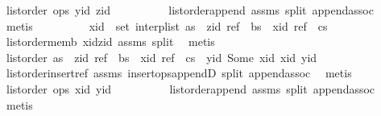 \begin{isabellebody}
\ {\isachardoublequoteopen}list{\isacharunderscore}order\ ops\ yid\ zid{\isachardoublequoteclose}\isanewline
\ \ \ \ \ \ \ \ \isamarkupfalse%
\ list{\isacharunderscore}order{\isacharunderscore}append\ assms{\isacharparenleft}{}{\isacharparenright}\ split\ append{\isachardot}assoc\ \isamarkupfalse%
\ metis\isanewline
\ \ \ \ \ \ \isamarkupfalse%
\ \isamarkupfalse%
\ {\isachardoublequoteopen}xid\ {\isasymin}\ set\ {\isacharparenleft}interp{\isacharunderscore}list\ {\isacharparenleft}as\ {\isacharat}\ {\isacharbrackleft}{\isacharparenleft}zid{\isacharcomma}\ ref{\isacharparenright}{\isacharbrackright}\ {\isacharat}\ bs\ {\isacharat}\ {\isacharbrackleft}{\isacharparenleft}xid{\isacharcomma}\ ref{\isacharparenright}{\isacharbrackright}\ {\isacharat}\ cs{\isacharparenright}{\isacharparenright}{\isachardoublequoteclose}\isanewline
\ \ \ \ \ \ \ \ \isamarkupfalse%
\ list{\isacharunderscore}order{\isacharunderscore}memb{}\ xid{\isacharunderscore}zid\ assms{\isacharparenleft}{}{\isacharparenright}\ split\ \isamarkupfalse%
\ metis\isanewline
\ \ \ \ \ \ \isamarkupfalse%
\ {\isachardoublequoteopen}list{\isacharunderscore}order\ {\isacharparenleft}as\ {\isacharat}\ {\isacharbrackleft}{\isacharparenleft}zid{\isacharcomma}\ ref{\isacharparenright}{\isacharbrackright}\ {\isacharat}\ bs\ {\isacharat}\ {\isacharbrackleft}{\isacharparenleft}xid{\isacharcomma}\ ref{\isacharparenright}{\isacharbrackright}\ {\isacharat}\ cs\ {\isacharat}\ {\isacharbrackleft}{\isacharparenleft}yid{\isacharcomma}\ Some\ xid{\isacharparenright}{\isacharbrackright}{\isacharparenright}\ xid\ yid{\isachardoublequoteclose}\isanewline
\ \ \ \ \ \ \ \ \isamarkupfalse%
\ list{\isacharunderscore}order{\isacharunderscore}insert{\isacharunderscore}ref\ assms{\isacharparenleft}{}{\isacharparenright}\ insert{\isacharunderscore}ops{\isacharunderscore}appendD\ split\ append{\isachardot}assoc\ \isamarkupfalse%
\ metis\isanewline
\ \ \ \ \ \ \isamarkupfalse%
\ {\isachardoublequoteopen}list{\isacharunderscore}order\ ops\ xid\ yid{\isachardoublequoteclose}\isanewline
\ \ \ \ \ \ \ \ \isamarkupfalse%
\ list{\isacharunderscore}order{\isacharunderscore}append\ assms{\isacharparenleft}{}{\isacharparenright}\ split\ append{\isachardot}assoc\ \isamarkupfalse%
\ metis\isanewline
\ \ \ \ \ \ \isamarkupfalse%
\ \isamarkupfalse%

\end{isabellebody}
